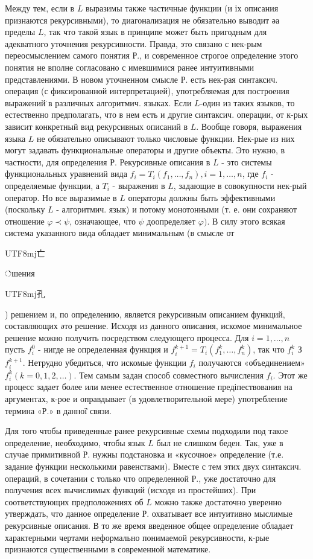 \documentclass[10pt]{article}
\begin{document}
Между тем, если в $L$ выразимы также частичные функции (и іх описания признаются рекурсивными), то диагонализация не обязательно выводит әа пределы $L$, так что такой язык в принципе может быть пригодным для адекватного уточнения рекурсивности. Правда, это связано с нек-рым переосмыслением самого понятия Р., и современное строгое определение этого понятия не вполне согласовано с имевшимися ранее интуитивными представлениями. В новом уточненном смысле Р. есть нек-рая синтаксич. операция (с фиксированной интерпретацией), употребляемая для построения выражений̈ в различных алгоритмич. языках. Если $L$-один из таких языков, то естественно предполагать, что в нем есть и другие синтаксич. операции, от к-рых зависит конкретный вид рекурсивных описаний в $L$. Вообще говоря, выражения языка $L$ не обязательно описывают только числовые функции. Нек-рые из них могут задавать функциональные операторы и другие объекты. Это нужно, в частности, для определения Р. Рекурсивные описания в $L$ - это системы функциональных уравнений вида $f_{i}=T_{i}\left(f_{1}, \ldots, f_{n}\right), i=1, \ldots, n$, где $f_{i}$ - определяемые функции, а $T_{i}$ - выражения в $L$, задающие в совокупности нек-рый оператор. Но все выразимые в $L$ операторы должны быть эффективными (поскольку $L$ - алгоритмич. язык) и потому монотонными (т. е. они сохраняют отношение $\varphi \prec \psi$, означающее, что $\psi$ доопределяет $\varphi)$. В силу этого всякая система указанного вида обладает минимальным (в смысле от\begin{CJK}{UTF8}{mj}亡\end{CJK}்шения \begin{CJK}{UTF8}{mj}孔\end{CJK}) решением и, по определению, является рекурсивным описанием функций, составляющих әто решение. Исходя из данного описания, искомое минимальное решение можно получить посредством следующего процесса. Для $i=1, \ldots, n$ пусть $f_{i}^{0}$ - нигде не определенная функция и $f_{i}^{k+1}=T_{i}\left(f_{1}^{k}, \ldots, f_{n}^{k}\right)$, так что $f_{i}^{k}$ З $f_{i}^{k+1}$. Нетрудно убедиться, что искомые функции $f_{i}$ получаются «объединением» $f_{i}^{k}(k=0,1,2, \ldots)$. Тем самым задан способ совместного вычисления $f_{i}$. Этот же процесс задает более или менее естественное отношение предіпествования на аргументах, к-рое и оправдывает (в удовлетворительной мере) употребление термина «Р.» в данної̈ связи.



Для того чтобы приведенные ранее рекурсивные схемы подходили под такое определение, необходимо, чтобы язык $L$ был не слишком беден. Так, уже в случае примитивной Р. нужны подстановка и «кусочное» определение (т.е. задание функции несколькими равенствами). Вместе с тем этих двух синтаксич. операций, в сочетании с только что определенной Р., уже достаточно для получения всех вычислимых функций (исходя из простейших). При соответствующих предположениях об $L$ можно также достаточно уверенно утверждать, что данное определение Р. охватывает все интуитивно мыслимые рекурсивные описания. В то же время введенное общее определение обладает характерными чертами неформально понимаемой рекурсивности, к-рые признаются существенными в современной математике.
\end{document}
